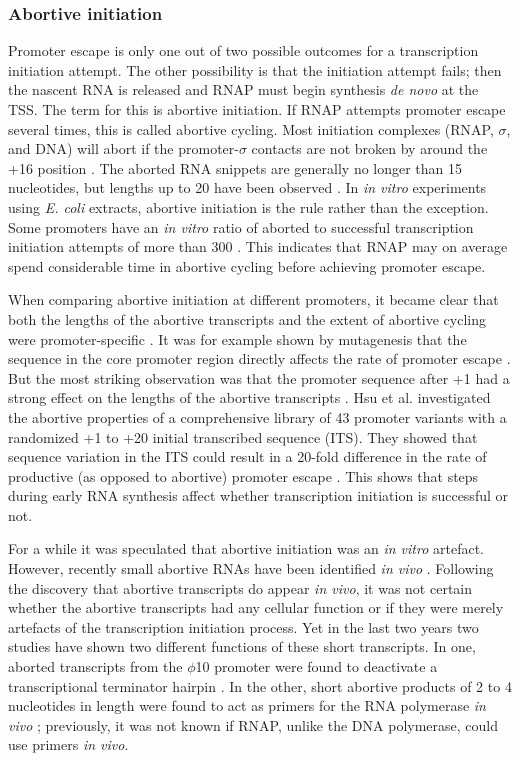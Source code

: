 \subsubsection{Abortive initiation}
Promoter escape is only one out of two possible outcomes for a transcription
initiation attempt. The other possibility is that the initiation attempt fails;
then the nascent RNA is released and RNAP must begin synthesis \textit{de novo}
at the TSS. The term for this is abortive initiation. If RNAP attempts
promoter escape several times, this is called abortive cycling. Most initiation
complexes (RNAP, $\sigma$, and DNA) will abort if the promoter-$\sigma$
contacts are not broken by around the +16 position
\cite{lilian_m_promoter_2002}. The aborted RNA snippets are generally no longer
than 15 nucleotides, but lengths up to 20 have been observed
\cite{chander_alternate_2007}. In \textit{in vitro} experiments using
\textit{E. coli} extracts, abortive initiation is the rule rather than the
exception. Some promoters have an \textit{in vitro} ratio of aborted to
successful transcription initiation attempts of more than 300
\cite{hsu_initial_2006}. This indicates that RNAP may on average spend
considerable time in abortive cycling before achieving promoter escape.

When comparing abortive initiation at different promoters, it became clear that
both the lengths of the abortive transcripts and the extent of abortive cycling
were promoter-specific \cite{hsu_vitro_2003}. It was for example shown by
mutagenesis that the sequence in the core promoter region directly affects the
rate of promoter escape \cite{vo_vitro_2003}. But the most striking observation
was that the promoter sequence after +1 had a strong effect on the lengths of
the abortive transcripts \cite{hsu_vitro_2003}. Hsu et al. investigated the
abortive properties of a comprehensive library of 43 promoter variants with a
randomized +1 to +20 initial transcribed sequence (ITS). They showed that
sequence variation in the ITS could result in a 20-fold difference in the rate
of productive (as opposed to abortive) promoter escape \cite{hsu_initial_2006}.
This shows that steps during early RNA synthesis affect whether transcription
initiation is successful or not.

For a while it was speculated that abortive initiation was an \textit{in vitro}
artefact. However, recently small abortive RNAs have been identified \textit{in
vivo} \cite{goldman_direct_2009}. Following the discovery that abortive
transcripts do appear \textit{in vivo}, it was not certain whether the abortive
transcripts had any cellular function or if they were merely artefacts of the
transcription initiation process. Yet in the last two years two studies have
shown two different functions of these short transcripts. In one, aborted
transcripts from the $\phi$10 promoter were found to deactivate a
transcriptional terminator hairpin \cite{lee_tiny_2010}. In the other, short
abortive products of 2 to 4 nucleotides in length were found to act as primers
for the RNA polymerase \textit{in vivo} \cite{goldman_nanornas_2011};
previously, it was not known if RNAP, unlike the DNA polymerase, could use
primers \textit{in vivo}.

